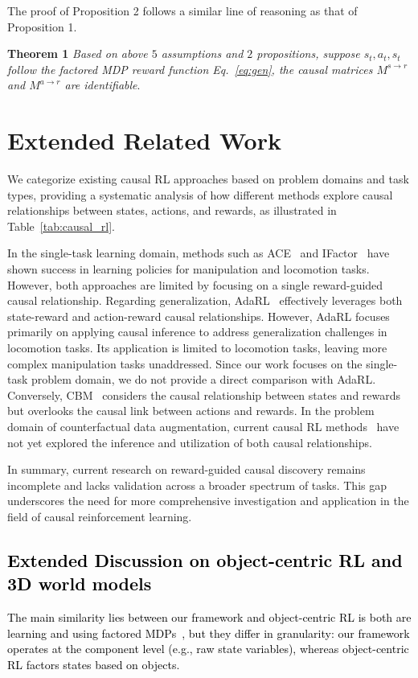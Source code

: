 The proof of Proposition 2 follows a similar line of reasoning as that of Proposition 1.

\textbf{Theorem 1} \textit{Based on above $5$ assumptions and $2$ propositions, suppose $s_t, a_t, s_t$ follow the factored MDP reward function Eq.~\ref{eq:gen}, the causal matrices $M^{s \to r}$ and $M^{a \to r}$ are identifiable}.

\section{Extended Related Work}
\label{sec:appendix_related_work}
We categorize existing causal RL approaches based on problem domains and task types, providing a systematic analysis of how different methods explore causal relationships between states, actions, and rewards, as illustrated in Table~\ref{tab:causal_rl}.

In the single-task learning domain, methods such as ACE~\citep{ji2024ace} and IFactor~\citep{liu2024learning} have shown success in learning policies for manipulation and locomotion tasks. However, both approaches are limited by focusing on a single reward-guided causal relationship.
Regarding generalization, AdaRL~\citep{huangadarl} effectively leverages both state-reward and action-reward causal relationships. 
However, AdaRL focuses primarily on applying causal inference to address generalization challenges in locomotion tasks. 
Its application is limited to locomotion tasks, leaving more complex manipulation tasks unaddressed. Since our work focuses on the single-task problem domain, we do not provide a direct comparison with AdaRL. 
Conversely, CBM~\citep{wang2024building} considers the causal relationship between states and rewards but overlooks the causal link between actions and rewards.
In the problem domain of counterfactual data augmentation, current causal RL methods~\citep{urpicausal,pitis2020counterfactual,pitis2022mocoda} have not yet explored the inference and utilization of both causal relationships.

In summary, current research on reward-guided causal discovery remains incomplete and lacks validation across a broader spectrum of tasks. This gap underscores the need for more comprehensive investigation and application in the field of causal reinforcement learning. 

\textcolor{black}{
\subsection{Extended Discussion on object-centric RL and 3D world models}
\label{ocrl}The main similarity lies between  our framework and object-centric RL is both are learning and using factored MDPs~\citep{kearns1999efficient}, but they differ in granularity: our framework operates at the component level (e.g., raw state variables), whereas object-centric RL factors states based on objects.}

